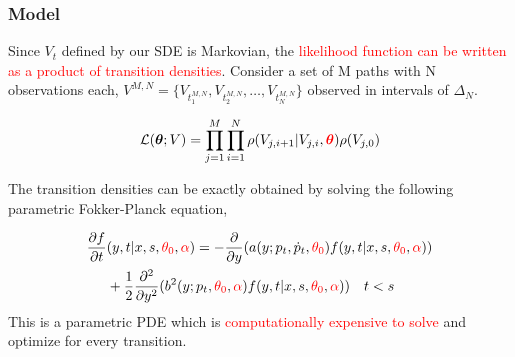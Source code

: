 \documentclass[aspectratio=169]{beamer}\usepackage[utf8]{inputenc}
\begin{document}
\begin{frame}\frametitle{Model}
Since $V_t$ defined by our SDE is Markovian, the \textcolor{red}{ likelihood function can be written as a product of transition densities}.  Consider a set of M paths with N observations each, $ V^{M,N}=\{ V_{t_1^{M,N}} , V_{t_2^{M,N}} ,\ldots , V_{t_N^{M,N}} \}$ observed in intervals of $\Delta_N$.

\begin{equation}
\mathcal{L}(\bm{\theta};V) =\prod\limits_{j=1}^M \prod\limits_{i=1}^N \rho ( {V_{j,i+1}|V_{j,i}},\textcolor{red}{ \bm{\theta} })  \rho (V_{j,0})
\label{likelihood}
\end{equation}

The transition densities can be exactly obtained by solving the following parametric Fokker-Planck equation,

\begin{equation}
\begin{split}
\frac{ \partial f }{\partial t } & (y ,t | x , s, \textcolor{red}{\theta_0} , \textcolor{red}{\alpha} )= - \frac{\partial}{ \partial y} ( a( y;  p_t, \dot{p}_t, \textcolor{red}{\theta_0} ) f( y ,t | x , s, \textcolor{red}{\theta_0}  , \textcolor{red}{\alpha} ) ) \\
& + \frac{1}{2} \frac{\partial^2}{ \partial y^2} ( b^2(y; p_t, \textcolor{red}{\theta_0}, \textcolor{red}{\alpha}  )  f(y ,t | x , s,\textcolor{red}{\theta_0} , \textcolor{red}{\alpha} ) ) \quad  t < s\\
\end{split}
\end{equation}
This is a parametric PDE which is \textcolor{red}{computationally expensive to solve} and optimize for every transition.
\end{frame}
\end{document}
